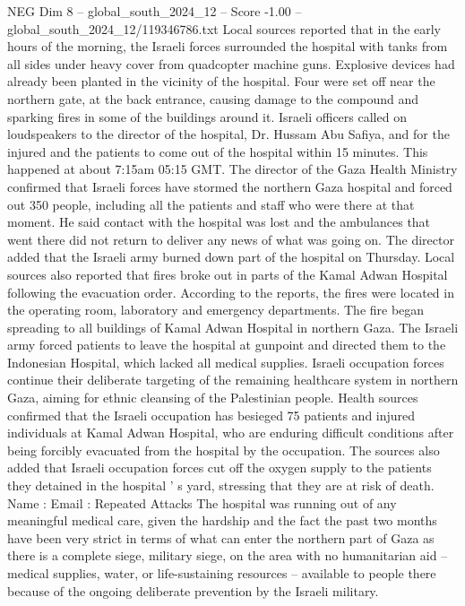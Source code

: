 \begin{textsample}{NEG Dim 8 – global\_south\_2024\_12 – Score -1.00 – global\_south\_2024\_12/119346786.txt}  \label{ex:f8_neg_101}
Local sources reported that in the early hours of the morning, the Israeli forces surrounded the hospital with tanks from all sides under heavy cover from quadcopter machine guns.
Explosive devices had already been planted in the vicinity of the hospital.
Four were set off near the northern gate, at the back entrance, causing damage to the compound and sparking fires in some of the buildings around it.
Israeli officers called on loudspeakers to the director of the hospital, Dr.
Hussam Abu Safiya, and for the injured and the patients to come out of the hospital within 15 minutes.
This happened at about 7:15am 05:15 GMT.
The director of the Gaza Health Ministry confirmed that Israeli forces have stormed the northern Gaza hospital and forced out 350 people, including all the patients and staff who were there at that moment.
He said contact with the hospital was lost and the ambulances that went there did not return to deliver any news of what was going on.
The director added that the Israeli army burned down part of the hospital on Thursday.
Local sources also reported that fires broke out in parts of the Kamal Adwan Hospital following the evacuation order.
According to the reports, the fires were located in the operating room, laboratory and emergency departments.
The fire began spreading to all buildings of Kamal Adwan Hospital in northern Gaza.
The Israeli army forced patients to leave the hospital at gunpoint and directed them to the Indonesian Hospital, which lacked all medical supplies.
Israeli occupation forces continue their deliberate targeting of the remaining healthcare system in northern Gaza, aiming for ethnic cleansing of the Palestinian people.
Health sources confirmed that the Israeli occupation has besieged 75 patients and injured individuals at Kamal Adwan Hospital, who are enduring difficult conditions after being forcibly evacuated from the hospital by the occupation.
The sources also added that Israeli occupation forces cut off the oxygen supply to the patients they detained in the hospital ' s yard, stressing that they are at risk of death.
Name : Email : Repeated Attacks The hospital was running out of any meaningful medical care, given the hardship and the fact the past two months have been very strict in terms of what can enter the northern part of Gaza as there is a complete siege, military siege, on the area with no humanitarian aid -- medical supplies, water, or life-sustaining resources -- available to people there because of the ongoing deliberate prevention by the Israeli military.

\end{textsample}
